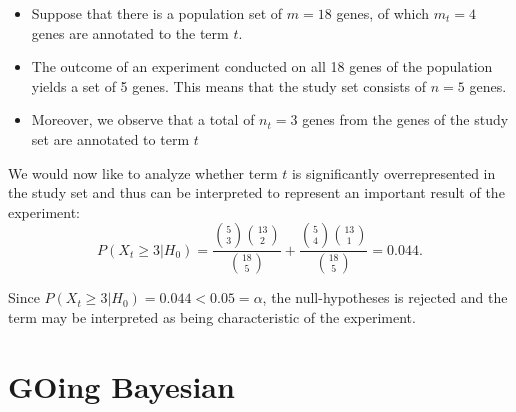 \documentclass{beamer}
\begin{document}
\begin{frame}


\begin{itemize}
 \item  Suppose that there is a population set of $m=18$ genes, of which
  $m_t=4$ genes are annotated to the term $t$.
  \item The outcome of an
  experiment conducted on all 18 genes of the population yields a set
  of 5 genes. This means that the study set consists of $n=5$
  genes.
  \item Moreover, we observe that a total of $n_t=3$ genes from the
  genes of the study set are annotated to term
  $t$ 
\end{itemize}


  We would now like to analyze whether term $t$ is significantly
  overrepresented in the study set and thus can be interpreted to
  represent an important result of the experiment:
\[
P(X_t\geq 3|H_0) = \frac{\displaystyle{5 \choose 3}\displaystyle{{13} \choose {2}}}{\displaystyle{18 
\choose 5}} + \frac{\displaystyle{5 \choose 4}\displaystyle{{13} \choose {1}}}{\displaystyle{18 
\choose 5}}
   = 0.044.
\]
\begin{tiny}Since $P(X_t\geq 3|H_0)=0.044<0.05=\alpha$, the null-hypotheses is
rejected and the term may be interpreted as being characteristic of
the experiment.\end{tiny}

\end{frame}









\section{GOing Bayesian}
\end{document}
